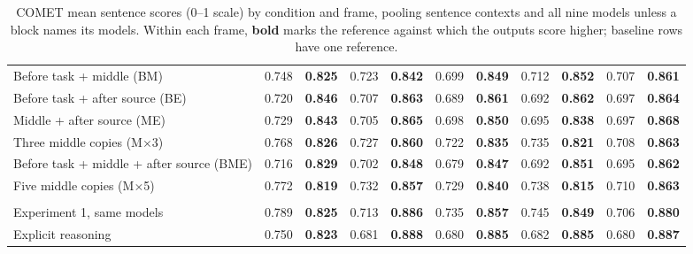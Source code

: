 \documentclass[11pt]{article}
\begin{document}
\begin{CJK*}{UTF8}{gbsn}
\begin{table}[p]
{\begin{tabular}{@{}>{\raggedright\arraybackslash}p{5.0cm}*{10}{r}@{}}
Before task + middle (BM) & 0.748 & \textbf{0.825} & 0.723 & \textbf{0.842} & 0.699 & \textbf{0.849} & 0.712 & \textbf{0.852} & 0.707 & \textbf{0.861} \\
Before task + after source (BE) & 0.720 & \textbf{0.846} & 0.707 & \textbf{0.863} & 0.689 & \textbf{0.861} & 0.692 & \textbf{0.862} & 0.697 & \textbf{0.864} \\
Middle + after source (ME) & 0.729 & \textbf{0.843} & 0.705 & \textbf{0.865} & 0.698 & \textbf{0.850} & 0.695 & \textbf{0.838} & 0.697 & \textbf{0.868} \\
Three middle copies (M$\times$3) & 0.768 & \textbf{0.826} & 0.727 & \textbf{0.860} & 0.722 & \textbf{0.835} & 0.735 & \textbf{0.821} & 0.708 & \textbf{0.863} \\
Before task + middle + after source (BME) & 0.716 & \textbf{0.829} & 0.702 & \textbf{0.848} & 0.679 & \textbf{0.847} & 0.692 & \textbf{0.851} & 0.695 & \textbf{0.862} \\
Five middle copies (M$\times$5) & 0.772 & \textbf{0.819} & 0.732 & \textbf{0.857} & 0.729 & \textbf{0.840} & 0.738 & \textbf{0.815} & 0.710 & \textbf{0.863} \\
\hline
\multicolumn{11}{@{}l}{\textbf{Explicit reasoning: GPT-5.5, Qwen3-8B and Qwen3-32B}}\\*
Experiment 1, same models & 0.789 & \textbf{0.825} & 0.713 & \textbf{0.886} & 0.735 & \textbf{0.857} & 0.745 & \textbf{0.849} & 0.706 & \textbf{0.880} \\
Explicit reasoning & 0.750 & \textbf{0.823} & 0.681 & \textbf{0.888} & 0.680 & \textbf{0.885} & 0.682 & \textbf{0.885} & 0.680 & \textbf{0.887} \\
\hline
\end{tabular}
\caption{COMET mean sentence scores (0--1 scale) by condition and frame, pooling sentence contexts and all nine models unless a block names its models. Within each frame, \textbf{bold} marks the reference against which the outputs score higher; baseline rows have one reference.}\label{tab:paper-metric-comet}
}
\end{table}


\end{CJK*}
\end{document}
